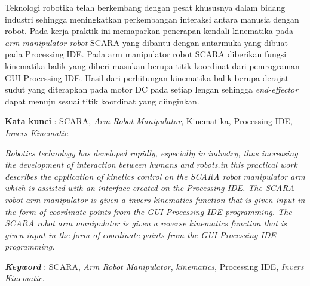 \documentclass{DTEDI_KP}
\begin{document}
\begin{abstractind}

Teknologi robotika telah berkembang dengan pesat khususnya dalam bidang industri sehingga meningkatkan perkembangan interaksi antara manusia dengan robot. Pada kerja praktik ini memaparkan penerapan kendali kinematika pada \textit{arm manipulator robot} SCARA yang dibantu dengan antarmuka yang dibuat pada Processing IDE. Pada arm manipulator robot SCARA diberikan fungsi kinematika balik yang diberi masukan berupa titik koordinat dari pemrograman GUI Processing IDE. Hasil dari perhitungan kinematika balik berupa derajat sudut yang diterapkan pada motor DC pada setiap lengan sehingga \textit{end-effector} dapat menuju sesuai titik koordinat yang diinginkan.

\textbf{Kata kunci }: SCARA, \textit{Arm Robot Manipulator}, Kinematika, Processing IDE, \textit{Invers Kinematic}.
\end{abstractind}

\begin{abstracteng}
\textit{Robotics technology has developed rapidly, especially in industry, thus increasing the development of interaction between humans and robots.in this practical work describes the application of kinetics control on the SCARA robot manipulator arm which is assisted with an interface created on the Processing IDE. The SCARA robot arm manipulator is given a invers  kinematics function that is given input in the form of coordinate points from the GUI Processing IDE programming. The SCARA robot arm manipulator is given a reverse kinematics function that is given input in the form of coordinate points from the GUI Processing IDE programming.}

\textit{\textbf{Keyword}} : SCARA, \textit{Arm Robot Manipulator}, \textit{kinematics}, Processing IDE, \textit{Invers Kinematic}.
\end{abstracteng}

\newpage
\setcounter{page}{1}








\end{document}
